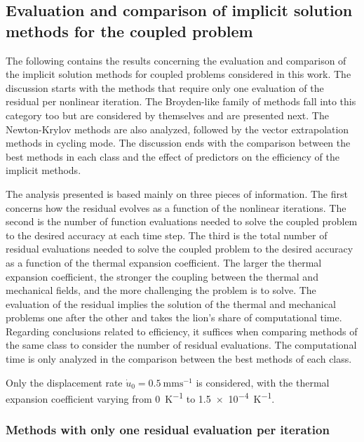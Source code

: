 \FloatBarrier

\subsection{Evaluation and comparison of implicit solution methods for the coupled problem}

The following contains the results concerning the evaluation and comparison of the implicit solution methods for coupled problems considered in this work.
The discussion starts with the methods that require only one evaluation of the residual per nonlinear iteration.
The Broyden-like family of methods fall into this category too but are considered by themselves and are presented next.
The Newton-Krylov methods are also analyzed, followed by the vector extrapolation methods in cycling mode.
The discussion ends with the comparison between the best methods in each class and the effect of predictors on the efficiency of the implicit methods.

The analysis presented is based mainly on three pieces of information.
The first concerns how the residual evolves as a function of the nonlinear iterations.
The second is the number of function evaluations needed to solve the coupled problem to the desired accuracy at each time step.
The third is the total number of residual evaluations needed to solve the coupled problem to the desired accuracy as a function of the thermal expansion coefficient.
The larger the thermal expansion coefficient, the stronger the coupling between the thermal and mechanical fields, and the more challenging the problem is to solve.
The evaluation of the residual implies the solution of the thermal and mechanical problems one after the other and takes the lion's share of computational time.
Regarding conclusions related to efficiency, it suffices when comparing methods of the same class to consider the number of residual evaluations.
The computational time is only analyzed in the comparison between the best methods of each class.

Only the displacement rate \(\dot u_0 = \SI{0.5}{\milli\meter\second^{-1}}\) is considered, with the thermal expansion coefficient varying from \SI{0}{\kelvin^{-1}} to \SI{1.5e-4}{\kelvin^{-1}}.

\subsubsection{Methods with only one residual evaluation per iteration}

